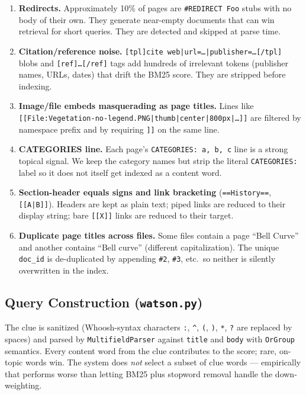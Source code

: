 \documentclass[11pt]{article}
\begin{document}
\begin{enumerate}
  \item \textbf{Redirects.} Approximately 10\% of pages are
        \texttt{\#REDIRECT Foo} stubs with no body of their own. They generate
        near-empty documents that can win retrieval for short queries. They are
        detected and skipped at parse time.

  \item \textbf{Citation/reference noise.}
        \texttt{[tpl]cite web|url=\ldots|publisher=\ldots[/tpl]} blobs and
        \texttt{[ref]\ldots[/ref]} tags add hundreds of irrelevant tokens
        (publisher names, URLs, dates) that drift the BM25 score. They are
        stripped before indexing.

  \item \textbf{Image/file embeds masquerading as page titles.} Lines like
        \texttt{[[File:Vegetation-no-legend.PNG|thumb|center|800px|\ldots]]}
        are filtered by namespace prefix and by requiring \texttt{]]} on the
        same line.

  \item \textbf{CATEGORIES line.} Each page's \texttt{CATEGORIES: a, b, c}
        line is a strong topical signal. We keep the category names but strip
        the literal \texttt{CATEGORIES:} label so it does not itself get indexed
        as a content word.

  \item \textbf{Section-header equals signs and link bracketing}
        (\texttt{==History==}, \texttt{[[A|B]]}). Headers are kept as plain
        text; piped links are reduced to their display string; bare
        \texttt{[[X]]} links are reduced to their target.

  \item \textbf{Duplicate page titles across files.} Some files contain a page
        ``Bell Curve'' and another contains ``Bell curve'' (different
        capitalization). The unique \texttt{doc\_id} is de-duplicated by
        appending \texttt{\#2}, \texttt{\#3}, etc.\ so neither is silently
        overwritten in the index.
\end{enumerate}

\subsection{Query Construction (\texttt{watson.py})}

The clue is sanitized (Whoosh-syntax characters \texttt{:}, \texttt{\^{}},
\texttt{(}, \texttt{)}, \texttt{*}, \texttt{?} are replaced by spaces) and
parsed by \texttt{MultifieldParser} against \texttt{title} and \texttt{body}
with \texttt{OrGroup} semantics. Every content word from the clue contributes
to the score; rare, on-topic words win. The system does \emph{not} select a
subset of clue words --- empirically that performs worse than letting BM25
plus stopword removal handle the down-weighting.
\end{document}
